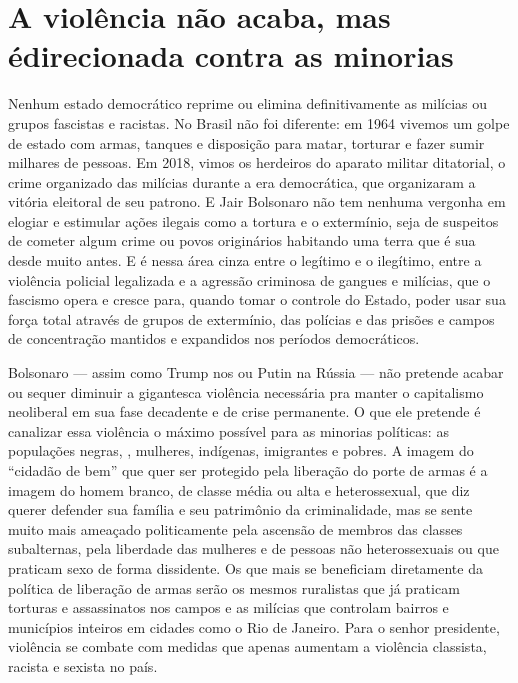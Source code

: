 \section{A violência não acaba, mas é\break direcionada contra as minorias}

Nenhum estado democrático reprime ou elimina definitivamente as milícias ou grupos fascistas e racistas. No Brasil não foi diferente: em 1964 vivemos um golpe de estado com armas, tanques e disposição para matar, torturar e fazer sumir milhares de pessoas. Em 2018, vimos os herdeiros do aparato militar ditatorial, o crime organizado das milícias durante a era democrática, que organizaram a vitória eleitoral de seu patrono. E Jair Bolsonaro não tem nenhuma vergonha em elogiar e estimular ações ilegais como a tortura e o extermínio, seja de suspeitos de cometer algum crime ou povos originários habitando uma terra que é sua desde muito antes. E é nessa área cinza entre o legítimo e o ilegítimo, entre a violência policial legalizada e a agressão criminosa de gangues e milícias, que o fascismo opera e cresce para, quando tomar o controle do Estado, poder usar sua força total através de grupos de extermínio, das polícias e das prisões e campos de concentração mantidos e expandidos nos períodos democráticos.

Bolsonaro --- assim como Trump nos  ou Putin na Rússia --- não pretende acabar ou sequer diminuir a gigantesca violência necessária pra manter o capitalismo neoliberal em sua fase decadente e de crise permanente. O que ele pretende é canalizar essa violência o máximo possível para as minorias políticas: as populações negras, , mulheres, indígenas, imigrantes e pobres. A imagem do ``cidadão de bem'' que quer ser protegido pela liberação do porte de armas é a imagem do homem branco, de classe média ou alta e heterossexual, que diz querer defender sua família e seu patrimônio da criminalidade, mas se sente muito mais ameaçado politicamente pela ascensão de membros das classes subalternas, pela liberdade das mulheres e de pessoas não heterossexuais ou que praticam sexo de forma dissidente. Os que mais se beneficiam diretamente da política de liberação de armas serão os mesmos ruralistas que já praticam torturas e assassinatos nos campos e as milícias que controlam bairros e municípios inteiros em cidades como o Rio de Janeiro. Para o senhor presidente, violência se combate com medidas que apenas aumentam a violência classista, racista e sexista no país.

